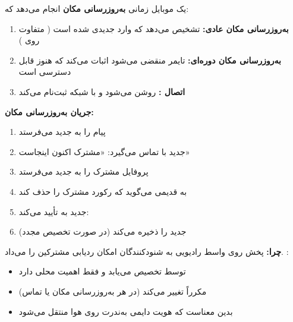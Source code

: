 
یک موبایل زمانی \textbf{به‌روزرسانی مکان} انجام می‌دهد که:

\begin{enumerate}
\def\labelenumi{\arabic{enumi}.}
\tightlist
\item
  \textbf{به‌روزرسانی مکان عادی:}  تشخیص می‌دهد که وارد  جدیدی شده است ( متفاوت روی )
\item
  \textbf{به‌روزرسانی مکان دوره‌ای:} تایمر منقضی می‌شود  اثبات می‌کند که  هنوز قابل دسترسی است
\item
  \textbf{اتصال :}  روشن می‌شود و با شبکه ثبت‌نام می‌کند
\end{enumerate}

\textbf{جریان به‌روزرسانی مکان:}

\begin{enumerate}
\def\labelenumi{\arabic{enumi}.}
\tightlist
\item
   پیام  را به  جدید می‌فرستد
\item
   جدید با  تماس می‌گیرد: «مشترک  اکنون اینجاست»
\item
   پروفایل مشترک را به  جدید می‌فرستد
\item
   به  قدیمی می‌گوید که رکورد مشترک را حذف کند
\item
   جدید به  تأیید می‌کند: 
\item
   جدید را ذخیره می‌کند (در صورت تخصیص مجدد)
\end{enumerate}


\textbf{چرا:} پخش  روی واسط رادیویی به شنودکنندگان امکان ردیابی مشترکین را می‌داد. :

\begin{itemize}
\tightlist
\item
  توسط  تخصیص می‌یابد و فقط اهمیت محلی دارد
\item
  مکرراً تغییر می‌کند (در هر به‌روزرسانی مکان یا تماس)
\item
  بدین معناست که هویت دایمی  به‌ندرت روی هوا منتقل می‌شود
\end{itemize}

